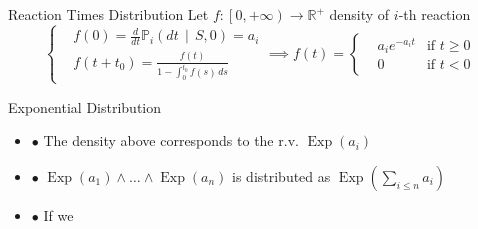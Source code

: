\documentclass{beamer}
\DeclareMathOperator{\Exp}{\text{Exp}}
\begin{document}
\begin{frame}{Reaction Times Distribution}
  Let $f:\left[0, +\infty\right) \longrightarrow \mathbb{R}^+$ density of $i$-th reaction 
  \begin{equation*}
    \left\{
    \begin{aligned}
      &f(0) = \frac{d}{dt} \mathbb{P}_i \left(dt \, \middle| \, S, 0 \right)= a_i\\
      &f(t + t_0) = \frac{f(t)}{1 - \int_0^{t_0} f(s)\, ds}         
    \end{aligned}\right.
    \implies f(t) = \left\{
    \begin{aligned}
        & a_i e^{-a_i t}   &\text{if } t \geq 0 \\
        &0 &\text{if } t < 0
    \end{aligned}\right.
  \end{equation*}
  \begin{block}{Exponential Distribution}
    \begin{itemize}
    \item $\bullet$ The density above corresponds to the r.v. $\Exp(a_i)$
    \item $\bullet$ $\Exp(a_1) \land \dots \land \Exp(a_n)$ is distributed as
      $\Exp\left(\sum_{i\leq n} a_i\right)$ 
    \item $\bullet$ If we 
    \end{itemize}
  \end{block}
\end{frame}
\end{document}
